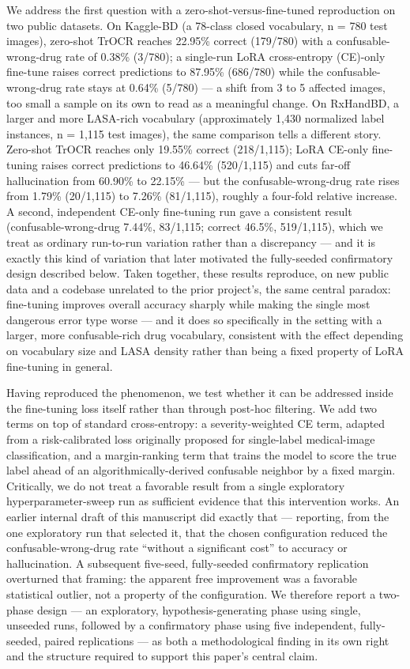 \documentclass[fleqn,10pt]{wlpeerj}
\begin{document}
We address the first question with a zero-shot-versus-fine-tuned reproduction on two public datasets. On Kaggle-BD (a 78-class closed vocabulary, n = 780 test images), zero-shot TrOCR reaches 22.95\% correct (179/780) with a confusable-wrong-drug rate of 0.38\% (3/780); a single-run LoRA cross-entropy (CE)-only fine-tune raises correct predictions to 87.95\% (686/780) while the confusable-wrong-drug rate stays at 0.64\% (5/780) --- a shift from 3 to 5 affected images, too small a sample on its own to read as a meaningful change. On RxHandBD, a larger and more LASA-rich vocabulary (approximately 1,430 normalized label instances, n = 1,115 test images), the same comparison tells a different story. Zero-shot TrOCR reaches only 19.55\% correct (218/1,115); LoRA CE-only fine-tuning raises correct predictions to 46.64\% (520/1,115) and cuts far-off hallucination from 60.90\% to 22.15\% --- but the confusable-wrong-drug rate rises from 1.79\% (20/1,115) to 7.26\% (81/1,115), roughly a four-fold relative increase. A second, independent CE-only fine-tuning run gave a consistent result (confusable-wrong-drug 7.44\%, 83/1,115; correct 46.5\%, 519/1,115), which we treat as ordinary run-to-run variation rather than a discrepancy --- and it is exactly this kind of variation that later motivated the fully-seeded confirmatory design described below. Taken together, these results reproduce, on new public data and a codebase unrelated to the prior project's, the same central paradox: fine-tuning improves overall accuracy sharply while making the single most dangerous error type worse --- and it does so specifically in the setting with a larger, more confusable-rich drug vocabulary, consistent with the effect depending on vocabulary size and LASA density rather than being a fixed property of LoRA fine-tuning in general.

Having reproduced the phenomenon, we test whether it can be addressed inside the fine-tuning loss itself rather than through post-hoc filtering. We add two terms on top of standard cross-entropy: a severity-weighted CE term, adapted from a risk-calibrated loss originally proposed for single-label medical-image classification, and a margin-ranking term that trains the model to score the true label ahead of an algorithmically-derived confusable neighbor by a fixed margin. Critically, we do not treat a favorable result from a single exploratory hyperparameter-sweep run as sufficient evidence that this intervention works. An earlier internal draft of this manuscript did exactly that --- reporting, from the one exploratory run that selected it, that the chosen configuration reduced the confusable-wrong-drug rate ``without a significant cost'' to accuracy or hallucination. A subsequent five-seed, fully-seeded confirmatory replication overturned that framing: the apparent free improvement was a favorable statistical outlier, not a property of the configuration. We therefore report a two-phase design --- an exploratory, hypothesis-generating phase using single, unseeded runs, followed by a confirmatory phase using five independent, fully-seeded, paired replications --- as both a methodological finding in its own right and the structure required to support this paper's central claim.
\end{document}

